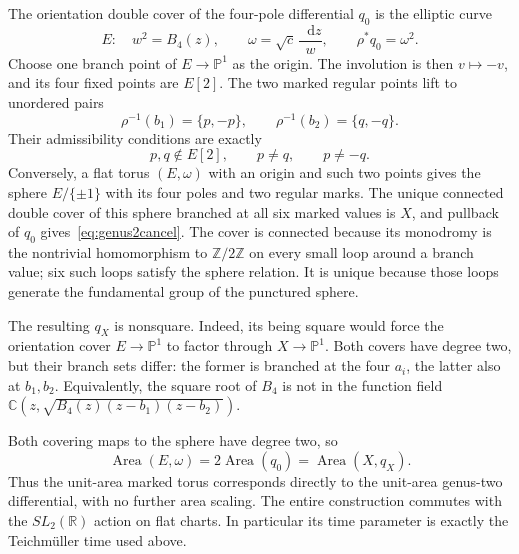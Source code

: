 \documentclass[11pt,a4paper]{article}
\numberwithin{equation}{section}
\theoremstyle{definition}
\theoremstyle{remark}
\newcommand{\dd}{\mathop{}\!\mathrm d}
\newcommand{\RR}{\mathbb R}
\newcommand{\CC}{\mathbb C}
\newcommand{\ZZ}{\mathbb Z}
\begin{document}
The orientation double cover of the four-pole differential $q_0$
is the elliptic curve
\begin{equation}
 E:\quad w^2=B_4(z),
 \qquad \omega=\sqrt c\,\frac{\dd z}{w},
 \qquad \rho^*q_0=\omega^2.
 \label{eq:genus2toruscover}
\end{equation}
Choose one branch point of $E\to\mathbb P^1$ as the origin.
The involution is then $v\mapsto-v$, and its four fixed points are
$E[2]$.  The two marked regular points lift to unordered pairs
\[
 \rho^{-1}(b_1)=\{p,-p\},\qquad
 \rho^{-1}(b_2)=\{q,-q\}.
\]
Their admissibility conditions are exactly
\begin{equation}
 p,q\notin E[2],\qquad p\ne q,\qquad p\ne -q.
 \label{eq:genus2torusadmissible}
\end{equation}
Conversely, a flat torus $(E,\omega)$ with an origin and such two
points gives the sphere $E/\{\pm1\}$ with its four poles and two
regular marks.  The unique connected double cover of this sphere
branched at all six marked values is $X$, and pullback of $q_0$
gives~\eqref{eq:genus2cancel}.
The cover is connected because its monodromy is the nontrivial
homomorphism to $\ZZ/2\ZZ$ on every small loop around a branch
value; six such loops satisfy the sphere relation.  It is unique
because those loops generate the fundamental group of the
punctured sphere.

The resulting $q_X$ is nonsquare.  Indeed, its being square would
force the orientation cover $E\to\mathbb P^1$ to factor through
$X\to\mathbb P^1$.  Both covers have degree two, but their branch
sets differ: the former is branched at the four $a_i$, the latter
also at $b_1,b_2$.
Equivalently, the square root of $B_4$ is not in the function field
$\CC(z,\sqrt{B_4(z)(z-b_1)(z-b_2)})$.

Both covering maps to the sphere have degree two, so
\begin{equation}
 \operatorname{Area}(E,\omega)
 =2\operatorname{Area}(q_0)
 =\operatorname{Area}(X,q_X).
 \label{eq:genus2equalareas}
\end{equation}
Thus the unit-area marked torus corresponds directly to the
unit-area genus-two differential, with no further area scaling.
The entire construction commutes with the $SL_2(\RR)$ action on
flat charts.  In particular its time parameter is exactly the
Teichm\"uller time used above.
\end{document}
